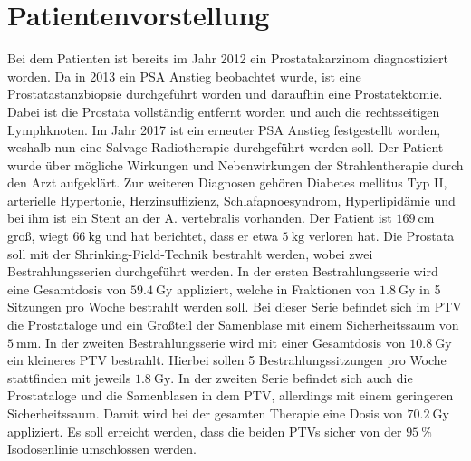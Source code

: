 \section{Patientenvorstellung}
\label{sec:Patientenvorstellung}
Bei dem Patienten ist bereits im Jahr 2012 ein Prostatakarzinom diagnostiziert worden.
Da in 2013 ein PSA Anstieg beobachtet wurde, ist eine Prostatastanzbiopsie durchgeführt worden und daraufhin eine Prostatektomie.
Dabei ist die Prostata vollständig entfernt worden und auch die rechtsseitigen Lymphknoten.
Im Jahr 2017 ist ein erneuter PSA Anstieg festgestellt worden, weshalb nun eine Salvage Radiotherapie durchgeführt werden soll.
Der Patient wurde über mögliche Wirkungen und Nebenwirkungen der Strahlentherapie durch den Arzt aufgeklärt.
Zur weiteren Diagnosen gehören Diabetes mellitus Typ II, arterielle
Hypertonie, Herzinsuffizienz, Schlafapnoesyndrom, Hyperlipidämie und bei ihm ist ein Stent an der A. vertebralis vorhanden.
Der Patient ist $\SI{169}{\centi\meter}$ groß, wiegt $\SI{66}{\kilogram}$ und hat berichtet,
dass er etwa $\SI{5}{\kilogram}$ verloren hat. Die Prostata soll mit der Shrinking-Field-Technik bestrahlt werden, wobei
zwei Bestrahlungsserien durchgeführt werden. In der ersten Bestrahlungsserie wird eine Gesamtdosis von $\SI{59,4}{\gray}$ appliziert,
welche in Fraktionen von $\SI{1,8}{\gray}$ in 5 Sitzungen pro Woche bestrahlt werden soll. Bei dieser Serie befindet sich im PTV die Prostataloge
und ein Großteil der Samenblase mit einem Sicherheitssaum von $\SI{5}{\milli\meter}$.
In der zweiten Bestrahlungsserie wird mit einer
Gesamtdosis von $\SI{10,8}{\gray}$ ein kleineres PTV bestrahlt. Hierbei sollen 5 Bestrahlungssitzungen pro Woche stattfinden mit jeweils $\SI{1,8}{\gray}$.
In der zweiten Serie befindet sich auch die Prostataloge und die Samenblasen in dem PTV, allerdings mit einem geringeren Sicherheitssaum.
Damit wird bei der gesamten Therapie eine Dosis von $\SI{70,2}{\gray}$ appliziert.
Es soll erreicht werden, dass die beiden PTVs sicher von der $\SI{95}{\percent}$ Isodosenlinie umschlossen werden.
